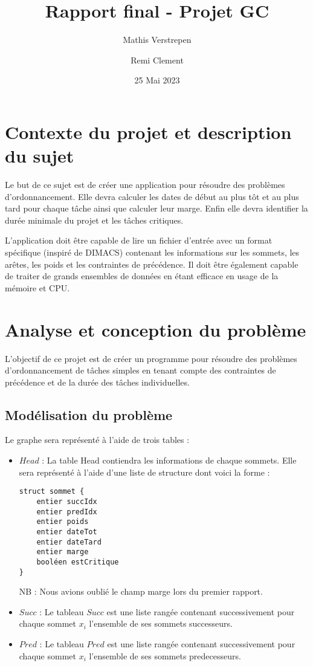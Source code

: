 \documentclass{article}
\title{Rapport final - Projet GC}
\date{25 Mai 2023}
\author{Mathis Verstrepen \and Remi Clement}
\begin{document}
\maketitle
\tableofcontents

\section{Contexte du projet et description du sujet}

Le but de ce sujet est de créer une application pour résoudre des problèmes d’ordonnancement.
Elle devra calculer les dates de début au plus tôt et au plus tard pour chaque tâche ainsi que calculer leur marge.
Enfin elle devra identifier la durée minimale du projet et les tâches critiques.

L'application doit être capable de lire un fichier d’entrée avec un format spécifique (inspiré de DIMACS) contenant les informations sur les sommets, les arêtes, les poids et les contraintes de précédence.
Il doit être également capable de traiter de grands ensembles de données en étant efficace en usage de la mémoire et CPU.

\section{Analyse et conception du problème}

L'objectif de ce projet est de créer un programme pour résoudre des problèmes d'ordonnancement de tâches simples en tenant compte des contraintes de précédence et de la durée des tâches individuelles. 

\subsection{Modélisation du problème}

Le graphe sera représenté à l'aide de trois tables :

\begin{itemize}
\item $Head$ : La table Head contiendra les informations de chaque sommets. Elle sera représenté à l'aide d'une liste de structure dont voici la forme :
\begin{verbatim}
struct sommet {
    entier succIdx
    entier predIdx
    entier poids
    entier dateTot
    entier dateTard
    entier marge
    booléen estCritique
}
\end{verbatim}
NB : Nous avions oublié le champ marge lors du premier rapport.

\item $Succ$ : Le tableau $Succ$ est une liste rangée contenant successivement pour chaque
sommet $x_i$ l’ensemble de ses sommets successeurs.

\item $Pred$ : Le tableau $Pred$ est une liste rangée contenant successivement pour chaque
sommet $x_i$ l’ensemble de ses sommets predecesseurs.
\end{itemize}
\end{document}
